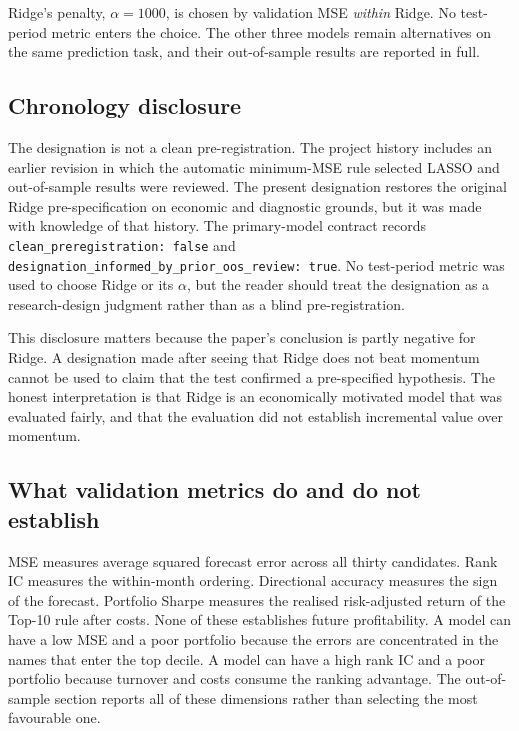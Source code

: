 \documentclass[11pt,a4paper]{article}
\begin{document}
Ridge's penalty, $\alpha=1000$, is chosen by validation MSE \emph{within} Ridge. No test-period metric enters the choice. The other three models remain alternatives on the same prediction task, and their out-of-sample results are reported in full.

\subsection{Chronology disclosure}

The designation is not a clean pre-registration. The project history includes an earlier revision in which the automatic minimum-MSE rule selected LASSO and out-of-sample results were reviewed. The present designation restores the original Ridge pre-specification on economic and diagnostic grounds, but it was made with knowledge of that history. The primary-model contract records \texttt{clean\_preregistration: false} and \texttt{designation\_informed\_by\_prior\_oos\_review: true}. No test-period metric was used to choose Ridge or its $\alpha$, but the reader should treat the designation as a research-design judgment rather than as a blind pre-registration.

This disclosure matters because the paper's conclusion is partly negative for Ridge. A designation made after seeing that Ridge does not beat momentum cannot be used to claim that the test confirmed a pre-specified hypothesis. The honest interpretation is that Ridge is an economically motivated model that was evaluated fairly, and that the evaluation did not establish incremental value over momentum.

\subsection{What validation metrics do and do not establish}

MSE measures average squared forecast error across all thirty candidates. Rank IC measures the within-month ordering. Directional accuracy measures the sign of the forecast. Portfolio Sharpe measures the realised risk-adjusted return of the Top-10 rule after costs. None of these establishes future profitability. A model can have a low MSE and a poor portfolio because the errors are concentrated in the names that enter the top decile. A model can have a high rank IC and a poor portfolio because turnover and costs consume the ranking advantage. The out-of-sample section reports all of these dimensions rather than selecting the most favourable one.
\end{document}
